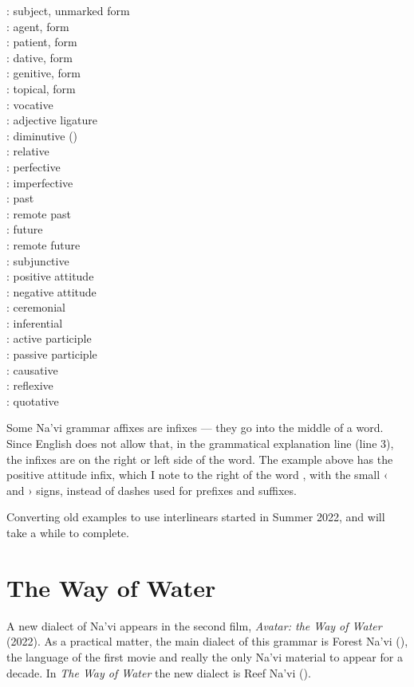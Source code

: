 \begin{multicols}{3}
\noindent{}: subject, unmarked form \\
: agent,  form \\
: patient,  form \\
: dative,  form \\
: genitive,  form \\
: topical,  form \\
: vocative  \\
: adjective  ligature\\
: diminutive () \\
: relative  \\
: perfective \\
: imperfective \\
: past \\
: remote past \\
: future \\
: remote future \\
: subjunctive \\
: positive attitude \\
: negative attitude \\
: ceremonial \\
: inferential \\
: active participle \\
: passive participle \\
: causative \\
: reflexive \\
: quotative 
\end{multicols}

\noindent Some Na'vi grammar affixes are infixes — they go into the
middle of a word.  Since English does not allow that, in the
grammatical explanation line (line 3), the infixes are on the right or
left side of the word.  The example above has the positive attitude
infix, which I note to the right of the word , with the small ‹
and › signs, instead of dashes used for prefixes and suffixes.

Converting old examples to use interlinears started in Summer 2022,
and will take a while to complete.


\section{The Way of Water}
A new dialect of Na'vi appears in the second film, \textit{Avatar: the
Way of Water} (2022).  As a practical matter, the main dialect of this
grammar is Forest Na'vi (), the language of the
first movie and really the only Na'vi material to appear for a decade.
In \textit{The Way of Water} the new dialect is Reef Na'vi ().

